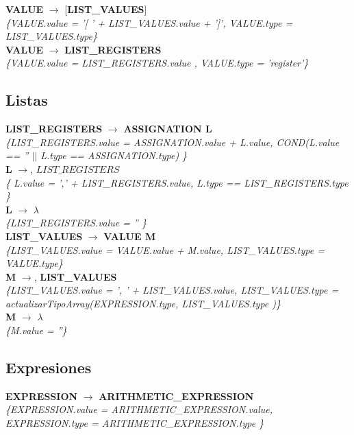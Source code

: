 \documentclass[10pt,a4paper]{article}
\begin{document}
\textbf{VALUE} $\rightarrow$ [\textbf{LIST\_VALUES}]   \\
\textit{\{VALUE.value =  '[ ' + LIST\_VALUES.value + ']', VALUE.type = LIST\_VALUES.type\}} \\

\textbf{VALUE} $\rightarrow$ \textbf{LIST\_REGISTERS} \\
\textit{\{VALUE.value =  LIST\_REGISTERS.value , VALUE.type = 'register'\}} \\

\subsection{Listas}
\textbf{LIST\_REGISTERS} $\rightarrow$ \textbf{ASSIGNATION L} \\
\textit{\{LIST\_REGISTERS.value =  ASSIGNATION.value + L.value, COND(L.value == '' $||$ L.type == ASSIGNATION.type) \}} \\

\textbf{L} $\rightarrow$, \textbf{$LIST\_REGISTERS$} \\
\textit{\{ L.value = ',' + LIST\_REGISTERS.value, L.type == LIST\_REGISTERS.type  \}} \\

\textbf{L} $\rightarrow$ $\lambda$\\
\textit{\{LIST\_REGISTERS.value =  '' \}}  \\ 

\textbf{LIST\_VALUES} $\rightarrow$ \textbf{VALUE M} \\
\textit{\{LIST\_VALUES.value =  VALUE.value + M.value, LIST\_VALUES.type = VALUE.type\}} \\

\textbf{M} $\rightarrow$, \textbf{LIST\_VALUES} \\
\textit{\{LIST\_VALUES.value = ', ' + LIST\_VALUES.value, LIST\_VALUES.type = actualizarTipoArray(EXPRESSION.type, LIST\_VALUES.type )\}} \\

\textbf{M} $\rightarrow$ $\lambda$ \\
\textit{\{M.value = ''\}} \\

\subsection{Expresiones}
\textbf{EXPRESSION} $\rightarrow$ \textbf{ARITHMETIC\_EXPRESSION} \\   
\textit{\{EXPRESSION.value =  ARITHMETIC\_EXPRESSION.value, EXPRESSION.type = ARITHMETIC\_EXPRESSION.type \}}  \\
\end{document}
